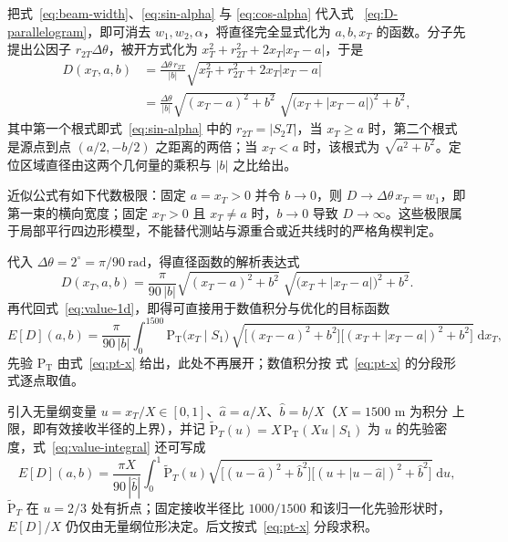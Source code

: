 把式~\eqref{eq:beam-width}、\eqref{eq:sin-alpha} 与 \eqref{eq:cos-alpha} 代入式
~\eqref{eq:D-parallelogram}，即可消去 $w_1,w_2,\alpha$，将直径完全显式化为
$a,b,x_T$ 的函数。分子先提出公因子 $r_{2T}\Delta\theta$，被开方式化为
$x_T^2+r_{2T}^2+2x_T\lvert x_T-a\rvert$，于是
\begin{equation}
    \begin{aligned}
        D(x_T,a,b)
        &=\frac{\Delta\theta\,r_{2T}}{|b|}
        \sqrt{x_T^2+r_{2T}^2+2x_T\lvert x_T-a\rvert}\\[2pt]
        &=\frac{\Delta\theta}{|b|}
        \sqrt{(x_T-a)^2+b^2}\;\sqrt{\bigl(x_T+\lvert x_T-a\rvert\bigr)^2+b^2},
    \end{aligned}
    \label{eq:D-exact}
\end{equation}
其中第一个根式即式~\eqref{eq:sin-alpha} 中的 $r_{2T}=|S_2T|$，当 $x_T\ge a$ 时，第二个根式是源点到点 $(a/2,-b/2)$ 之距离的两倍；当 $x_T<a$ 时，该根式为 $\sqrt{a^2+b^2}$。定位区域直径由这两个几何量的乘积与 $|b|$ 之比给出。

近似公式有如下代数极限：固定 $a=x_T>0$ 并令 $b\to0$，则 $D\to\Delta\theta\,x_T=w_1$，即第一束的横向宽度；固定 $x_T>0$ 且 $x_T\ne a$ 时，$b\to0$ 导致 $D\to\infty$。这些极限属于局部平行四边形模型，不能替代测站与源重合或近共线时的严格角楔判定。

代入 $\Delta\theta=2^\circ=\pi/90\ \mathrm{rad}$，得直径函数的解析表达式
\begin{equation}
    D(x_T,a,b)=\frac{\pi}{90\,|b|}
    \sqrt{(x_T-a)^2+b^2}\;\sqrt{\bigl(x_T+\lvert x_T-a\rvert\bigr)^2+b^2}.
    \label{eq:D-final}
\end{equation}
再代回式~\eqref{eq:value-1d}，即得可直接用于数值积分与优化的目标函数
\begin{equation}
    E[D](a,b)=\frac{\pi}{90\,|b|}\int_0^{1500}
    \mathrm{P_T}\bigl(x_T\mid S_1\bigr)\,
    \sqrt{\bigl[(x_T-a)^2+b^2\bigr]
    \bigl[(x_T+\lvert x_T-a\rvert)^2+b^2\bigr]}\;\mathrm{d}x_T ,
    \label{eq:value-integral}
\end{equation}
先验 $\mathrm{P_T}$ 由式~\eqref{eq:pt-x} 给出，此处不再展开；数值积分按
式~\eqref{eq:pt-x} 的分段形式逐点取值。

引入无量纲变量 $u=x_T/X\in[0,1]$、$\hat a=a/X$、$\hat b=b/X$（$X=1500$ m 为积分
上限，即有效接收半径的上界），并记 $\tilde{\mathrm P}_T(u)=X\,\mathrm{P_T}(Xu\mid S_1)$
为 $u$ 的先验密度，式~\eqref{eq:value-integral} 还可写成
\begin{equation}
    E[D](a,b)=\frac{\pi X}{90\,|\hat b|}
    \int_0^1\tilde{\mathrm P}_T(u)\sqrt{\bigl[(u-\hat a)^2+\hat b^2\bigr]
    \bigl[(u+\lvert u-\hat a\rvert)^2+\hat b^2\bigr]}\;\mathrm{d}u,
    \label{eq:value-scaled}
\end{equation}
$\tilde{\mathrm P}_T$ 在 $u=2/3$ 处有折点；固定接收半径比 $1000/1500$ 和该归一化先验形状时，$E[D]/X$ 仍仅由无量纲位形决定。后文按式~\eqref{eq:pt-x} 分段求积。

